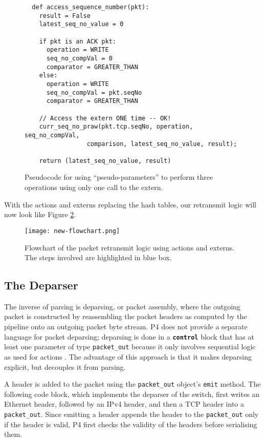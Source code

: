 \begin{figure}[!h]
	{\renewcommand{\baselinestretch}{0.8}\small
		\begin{verbatim}
  def access_sequence_number(pkt):
    result = False
    latest_seq_no_value = 0
    
    if pkt is an ACK pkt:
      operation = WRITE
      seq_no_compVal = 0
      comparator = GREATER_THAN
    else:
      operation = WRITE
      seq_no_compVal = pkt.seqNo
      comparator = GREATER_THAN
    
    // Access the extern ONE time -- OK!
    curr_seq_no_praw(pkt.tcp.seqNo, operation, seq_no_compVal, 
                 comparison, latest_seq_no_value, result);
    
    return (latest_seq_no_value, result)
		\end{verbatim}
	}
	\caption{Pseudocode for using ``pseudo-parameters'' to perform three operations using only one call to the extern.}
	\label{fig:fix}
\end{figure}

With the actions and externs replacing the hash tables, our retransmit logic will now look like Figure \ref{fig:new-flowchart}.

\begin{figure}[!h]
	\centering
	\texttt{[image: new-flowchart.png]}
	\caption{Flowchart of the packet retransmit logic using actions and externs. The steps involved are highlighted in blue box.}
	\label{fig:new-flowchart}
\end{figure}

	\subsection{The Deparser}
The inverse of parsing is deparsing, or packet assembly, where the outgoing packet is constructed by reassembling the packet headers as computed by the pipeline onto an outgoing packet byte stream. P4 does not provide a separate language for packet deparsing; deparsing is done in a \textbf{\texttt{control}} block that has at least one parameter of type \verb|packet_out| because it only involves sequential logic as used for actions \cite{p4spec}. The advantage of this approach is that it makes deparsing explicit, but decouples it from parsing. 

A header is added to the packet using the \verb|packet_out| object's \texttt{emit} method. The following code block, which implements the deparser of the switch, first writes an Ethernet header, followed by an IPv4 header, and then a TCP header into a \verb|packet_out|. Since emitting a header appends the header to the \verb|packet_out| only if the header is valid, P4 first checks the validity of the headers before serialising them.

